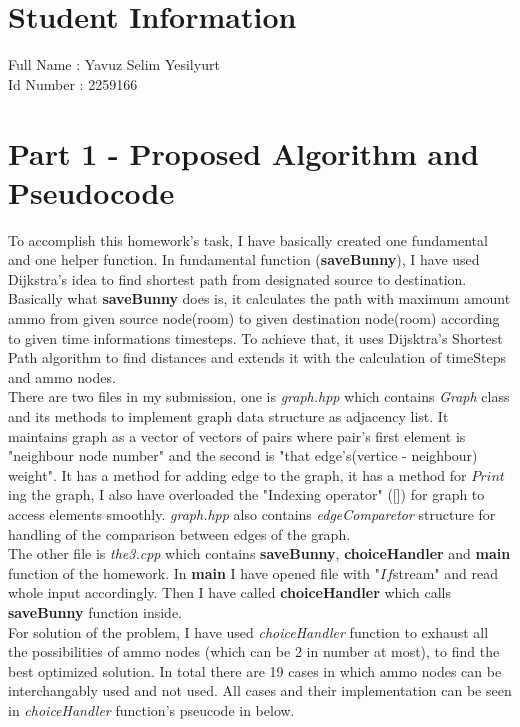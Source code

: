 \documentclass[10pt]{article}
\begin{document}
\section*{Student Information} 
Full Name : Yavuz Selim Yesilyurt \\
Id Number : 2259166 \\

\section*{Part 1 - Proposed Algorithm and Pseudocode}
\hspace{4mm}	
To accomplish this homework's task, I have basically created one fundamental and one helper function. In fundamental function (\textbf{saveBunny}), I have used Dijkstra's idea to find shortest path from designated source to destination. Basically what \textbf{saveBunny} does is, it calculates the path with maximum amount ammo from given source node(room) to given destination node(room) according to given time informations timesteps. To achieve that, it uses Dijsktra's Shortest Path algorithm to find distances and extends it with the calculation of timeSteps and ammo nodes. \\

There are two files in my submission, one is \textit{graph.hpp} which contains \textit{Graph} class and its methods to implement graph data structure as adjacency list. It maintains graph as a vector of vectors of pairs where pair's first element is "neighbour node number" and the second is "that edge's(vertice - neighbour) weight". It has a method for adding edge to the graph, it has a method for $Print$ing the graph, I also have overloaded the "Indexing operator" ([]) for graph to access elements smoothly. \textit{graph.hpp} also contains \textit{edgeComparetor} structure for handling of the comparison between edges of the graph. \\

The other file is \textit{the3.cpp} which contains \textbf{saveBunny}, \textbf{choiceHandler} and \textbf{main} function of the homework. In \textbf{main} I have opened file with "$If$stream" and read whole input accordingly. Then I have called \textbf{choiceHandler} which calls \textbf{saveBunny} function inside. \\

For solution of the problem, I have used \textit{choiceHandler} function to exhaust all the possibilities of ammo nodes (which can be 2 in number at most), to find the best optimized solution. In total there are 19 cases in which ammo nodes can be interchangably used and not used. All cases and their implementation can be seen in \textit{choiceHandler} function's pseucode in below. \\ 
\end{document}
